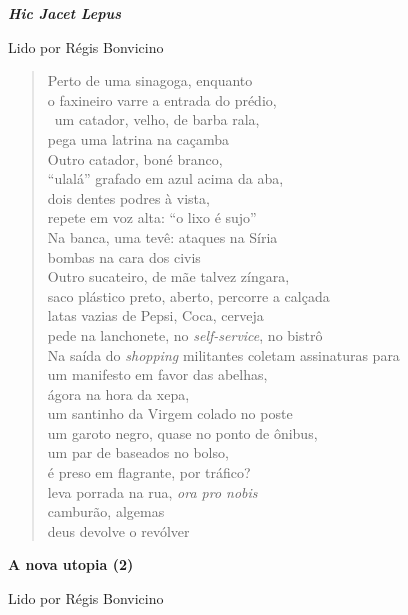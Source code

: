 \pagebreak

\textbf{\emph{Hic Jacet Lepus}}

Lido por Régis Bonvicino

\begin{verse}
Perto de uma sinagoga, enquanto\\
o faxineiro varre a entrada do prédio,\\\
um catador, velho, de barba rala,\\
pega uma latrina na caçamba\\[5pt]
Outro catador, boné branco,\\
``ulalá'' grafado em azul acima da aba,\\
dois dentes podres à vista,\\
repete em voz alta: ``o lixo é sujo''\\[5pt]
Na banca, uma tevê: ataques na Síria\\
bombas na cara dos civis\\
Outro sucateiro, de mãe talvez zíngara,\\
saco plástico preto, aberto, percorre a calçada\\[5pt]
latas vazias de Pepsi, Coca, cerveja\\
pede na lanchonete, no \emph{self-service}, no bistrô\\
Na saída do \emph{shopping} militantes coletam assinaturas para\\
um manifesto em favor das abelhas,\\[5pt]
ágora na hora da xepa,\\
um santinho da Virgem colado no poste\\
um garoto negro, quase no ponto de ônibus,\\
um par de baseados no bolso,\\[5pt]
é preso em flagrante, por tráfico?\\
leva porrada na rua, \emph{ora pro nobis}\\
camburão, algemas\\
deus devolve o revólver
\end{verse}

\pagebreak

\textbf{A nova utopia (2)}

Lido por Régis Bonvicino

